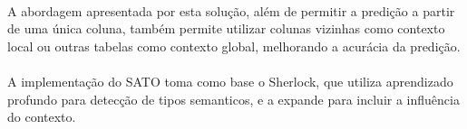 \paragraph{} A abordagem apresentada por esta solução, além de permitir a predição a partir de uma única coluna, também permite utilizar colunas vizinhas como contexto local ou outras tabelas como contexto global, melhorando a acurácia da predição.

\paragraph{} A implementação do SATO toma como base o Sherlock\cite{hulsebos2019sherlock}, que utiliza aprendizado profundo para detecção de tipos semanticos, e a expande para incluir a influência do contexto.

